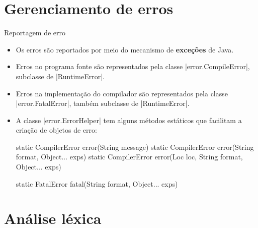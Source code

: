 \documentclass[smaller]{beamer}
\begin{document}
\section{Gerenciamento de erros}

\begin{frame}{Reportagem de erro}
  \begin{itemize}
    \item Os erros são reportados por meio do mecanismo de
    \textbf{exceções} de Java.
    \item Erros no programa fonte são representados pela classe
    \pyginline|error.CompileError|, subclasse de
    \pyginline|RuntimeError|.
    \item Erros na implementação do compilador são representados pela
    classe \pyginline|error.FatalError|, também subclasse de
    \pyginline|RuntimeError|.
    \item A classe \pyginline|error.ErrorHelper| tem alguns métodos
    estáticos que facilitam a criação de objetos de erro:
\begin{pygmented}[]
static CompilerError error(String message)
static CompilerError error(String format, Object... exps)
static CompilerError error(Loc loc, String format, Object... exps)

static FatalError fatal(String format, Object... exps)
\end{pygmented}
  \end{itemize}
\end{frame}


\section{Análise léxica}
\end{document}
